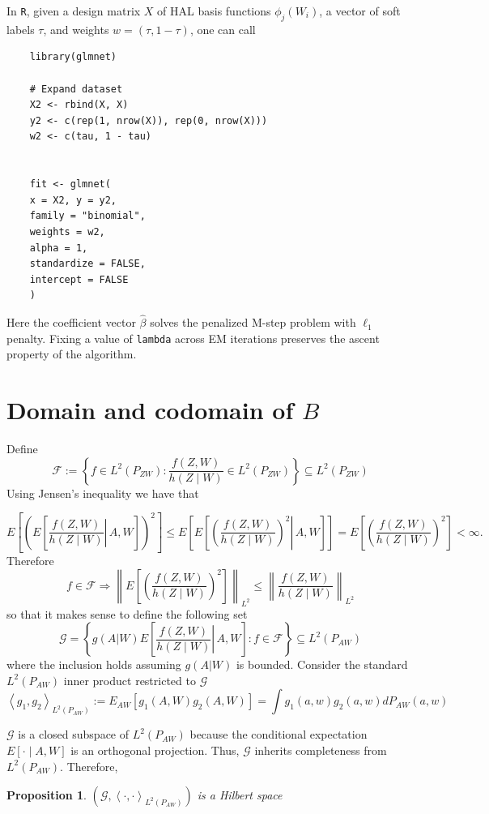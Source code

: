 \documentclass[12pt]{article}
\theoremstyle{thmstyleone}%
\newtheorem{propo}[theo]{Proposition}%
\theoremstyle{thmstyletwo}%
\theoremstyle{thmstylethree}%
\begin{document}
\medskip
In \texttt{R}, given a design matrix $X$ of HAL basis functions $\phi_j(W_i)$, 
a vector of soft labels $\tau$, and weights $w=(\tau,1-\tau)$, one can call
\begin{verbatim}
	library(glmnet)
	
	# Expand dataset
	X2 <- rbind(X, X)
	y2 <- c(rep(1, nrow(X)), rep(0, nrow(X)))
	w2 <- c(tau, 1 - tau)
	

	fit <- glmnet(
	x = X2, y = y2,
	family = "binomial",
	weights = w2,
	alpha = 1,          
	standardize = FALSE,  
	intercept = FALSE    
	)
\end{verbatim}
Here the coefficient vector $\hat\beta$ solves the penalized M-step problem
with $\ell_1$ penalty.  Fixing a value of \texttt{lambda} across EM iterations 
preserves the ascent property of the algorithm.


\section{Domain and codomain of \texorpdfstring{$B$}{B}}\label{app:fg}
Define
$$\mathcal{F}:=\left\{f \in L^2\left(P_{Z W}\right): \frac{f(Z, W)}{h(Z \mid W)} \in L^2\left(P_{Z W}\right)\right\} \subseteq L^2(P_{ZW})$$
Using Jensen's inequality we have that

$${E}\left[\left({E}\left[\left.\frac{f(Z, W)}{h(Z \mid W)} \right\rvert\, A, W\right]\right)^2\right] \leq {E}\left[{E}\left[\left.\left(\frac{f(Z, W)}{h(Z \mid W)}\right)^2 \right\rvert\, A, W\right]\right] ={E}\left[\left(\frac{f(Z, W)}{h(Z \mid W)}\right)^2\right]<\infty .$$
Therefore $$f \in \mathcal{F} \Longrightarrow \left\|{E}\left[\left(\frac{f(Z, W)}{h(Z \mid W)}\right)^2\right]\right\|_{L^2} \leq\left\|\frac{f(Z, W)}{h(Z \mid W)}\right\|_{L^2}$$
so that it makes sense to define the following set
$$\mathcal{G}=\left\{g(A|W){E}\left[\left.\frac{f(Z, W)}{h(Z \mid W)} \right\rvert\, A, W\right]: f \in \mathcal{F}\right\} \subseteq L^2\left(P_{A W}\right) $$
where the inclusion holds assuming $g(A|W)$ is bounded. Consider the standard $L^2(P_{AW})$ inner product restricted to $\mathcal{G}$
$$\left\langle g_1, g_2\right\rangle_{L^2(P_{AW})}:={E}_{A W}\left[g_1(A, W) g_2(A, W)\right]=\int g_1(a, w) g_2(a, w) d P_{A W}(a, w)$$

$\mathcal{G}$ is a closed subspace of $L^2\left(P_{A W}\right)$ because the conditional expectation ${E}[\cdot \mid A, W]$ is an orthogonal projection.
Thus, $\mathcal{G}$ inherits completeness from $L^2\left(P_{A W}\right)$. Therefore, 
\begin{propo} $\left( \mathcal{G}, \left\langle \cdot,\cdot\right\rangle_{L^2(P_{AW})}\right)$ 
	is a Hilbert space
\end{propo}
\end{document}
